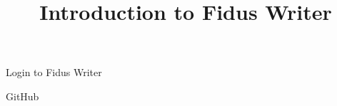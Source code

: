 \documentclass{article}
\begin{document}
\title{Introduction to Fidus Writer}

\maketitle


Login to Fidus Writer


GitHub
\end{document}
